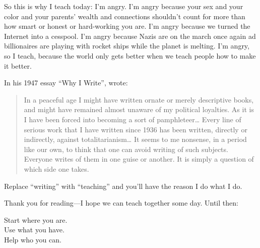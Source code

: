 So this is why I teach today:
I'm angry.
I'm angry because your sex and your color and your parents' wealth and connections
shouldn't count for more than how smart or honest or hard-working you are.
I'm angry because we turned the Internet into a cesspool.
I'm angry because Nazis are on the march once again
ad billionaires are playing with rocket ships while the planet is melting.
I'm angry,
so I teach,
because the world only gets better when we teach people how to make it better.

In his 1947 essay ``Why I Write'',
 wrote:

\begin{quote}

  In a peaceful age I might have written ornate or merely descriptive books,
  and might have remained almost unaware of my political loyalties.
  As it is I have been forced into becoming a sort of pamphleteer{\ldots}
  Every line of serious work that I have written since 1936 has been written,
  directly or indirectly,
  against totalitarianism{\ldots}
  It seems to me nonsense,
  in a period like our own,
  to think that one can avoid writing of such subjects.
  Everyone writes of them in one guise or another.
  It is simply a question of which side one takes.

\end{quote}

\noindent
Replace ``writing'' with ``teaching'' and you'll have the reason I do what I do.

\noindent
Thank you for reading---I hope we can teach together some day.
Until then:

\begin{center}

Start where you are.\\
Use what you have.\\
Help who you can.

\end{center}
